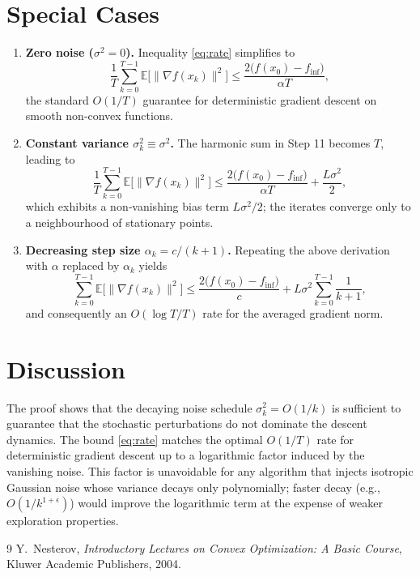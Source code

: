 \documentclass{article}
\newcommand{\E}{\mathbb{E}}
\begin{document}
\section*{Special Cases}
\begin{enumerate}[label=\textbf{Case \arabic*:}, leftmargin=*]
\item \textbf{Zero noise ($\sigma^{2}=0$).} Inequality \eqref{eq:rate} simplifies to
\[
\frac{1}{T}\sum_{k=0}^{T-1}\E\!\bigl[\|\nabla f(x_{k})\|^{2}\bigr]
\le \frac{2\bigl(f(x_{0})-f_{\inf}\bigr)}{\alpha T},
\]
the standard $O(1/T)$ guarantee for deterministic gradient descent on smooth non‑convex functions.

\item \textbf{Constant variance $\sigma_{k}^{2}\equiv\sigma^{2}$.} The harmonic sum in Step 11 becomes $T$, leading to
\[
\frac{1}{T}\sum_{k=0}^{T-1}\E\!\bigl[\|\nabla f(x_{k})\|^{2}\bigr]
\le \frac{2\bigl(f(x_{0})-f_{\inf}\bigr)}{\alpha T}+ \frac{L\sigma^{2}}{2},
\]
which exhibits a non‑vanishing bias term $L\sigma^{2}/2$; the iterates converge only to a neighbourhood of stationary points.

\item \textbf{Decreasing step size $\alpha_{k}=c/(k+1)$.} Repeating the above derivation with $\alpha$ replaced by $\alpha_{k}$ yields
\[
\sum_{k=0}^{T-1}\E\!\bigl[\|\nabla f(x_{k})\|^{2}\bigr]
\le
\frac{2\bigl(f(x_{0})-f_{\inf}\bigr)}{c}
+ L\sigma^{2}\sum_{k=0}^{T-1}\frac{1}{k+1},
\]
and consequently an $O(\log T/T)$ rate for the averaged gradient norm.
\end{enumerate}

\section*{Discussion}
The proof shows that the decaying noise schedule $\sigma_{k}^{2}=O(1/k)$ is sufficient to guarantee that the stochastic perturbations do not dominate the descent dynamics. The bound \eqref{eq:rate} matches the optimal $O(1/T)$ rate for deterministic gradient descent up to a logarithmic factor induced by the vanishing noise. This factor is unavoidable for any algorithm that injects isotropic Gaussian noise whose variance decays only polynomially; faster decay (e.g., $O(1/k^{1+\epsilon})$) would improve the logarithmic term at the expense of weaker exploration properties.

\begin{thebibliography}{9}
Y.~Nesterov,
\emph{Introductory Lectures on Convex Optimization: A Basic Course},
Kluwer Academic Publishers, 2004.
\end{thebibliography}
\end{document}
